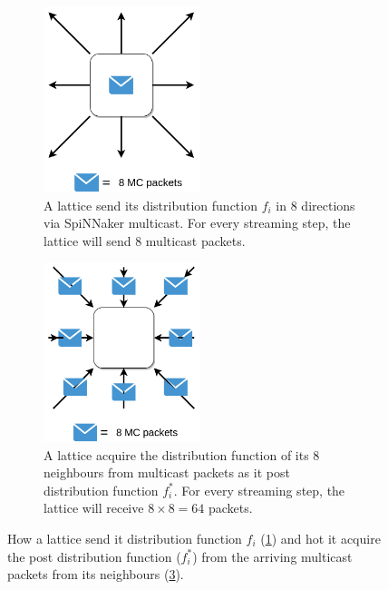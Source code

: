 \begin{figure}[!tb]

\begin{subfigure}[!tb]{0.5\textwidth}
       \centering
       \includegraphics[width=0.5\textwidth]{figures/send.png}
       \caption{A lattice send its distribution function $f_i$ in 8 directions via SpiNNaker multicast. For every streaming step, the lattice will send 8 multicast packets.}
       \label{fig:spinn_send}
   \end{subfigure}
   \begin{subfigure}[!tb]{0.5\textwidth}
   \centering
       \includegraphics[width=0.5\textwidth]{figures/receive.png}
       \caption{A lattice acquire the distribution function of its 8 neighbours from multicast packets as it post distribution function $f_i^{*}$. For every streaming step, the lattice will receive $8\times8=64$ packets.}
       \label{fig:spinn_receive}
   \end{subfigure}
   \caption{How a lattice send it distribution function $f_i$ (\ref{fig:spinn_send}) and hot it acquire the post distribution function ($f_i^{*}$) from the arriving multicast packets from its neighbours (\ref{fig:spinn_receive}).}
\end{figure}

